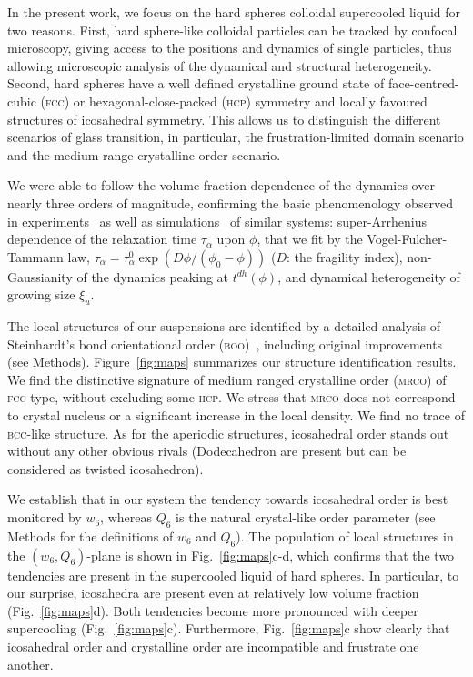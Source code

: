 In the present work, we focus on the hard spheres colloidal supercooled liquid for two reasons. First, hard sphere-like colloidal particles can be tracked by confocal microscopy, giving access to the positions and dynamics of single particles, thus allowing microscopic analysis of the dynamical and structural heterogeneity. Second, hard spheres have a well defined crystalline ground state of face-centred-cubic (\textsc{fcc}) or hexagonal-close-packed (\textsc{hcp}) symmetry and locally favoured structures of icosahedral symmetry. This allows us to distinguish the different scenarios of glass transition, in particular, the frustration-limited domain scenario and the medium range crystalline order scenario.



We were able to follow the volume fraction dependence of the dynamics over nearly three orders of magnitude, confirming the basic phenomenology observed in experiments~\citep{pusey1987ogt, kegel2000swe, weeks2000, Berthier2005} as well as simulations~\citep{Kawasaki2010} of similar systems: super-Arrhenius dependence of the relaxation time $\tau_\alpha$ upon $\phi$, that we fit by the Vogel-Fulcher-Tammann law, 
$\tau_\alpha=\tau_\alpha^0 \exp(D\phi/(\phi_0-\phi))$ ($D$: the fragility index), non-Gaussianity of the dynamics peaking at $t^{dh}(\phi)$, and dynamical heterogeneity of growing size $\xi_u$.



The local structures of our suspensions are identified by a detailed analysis of Steinhardt's bond orientational order (\textsc{boo})~\citep{steinhardt1983boo}, including original improvements (see Methods). Figure~\ref{fig:maps} summarizes our structure identification results. We find the distinctive signature of medium ranged crystalline order (\textsc{mrco}) of \textsc{fcc} type, without excluding some \textsc{hcp}. We stress that \textsc{mrco} does not correspond to crystal nucleus or a significant increase in the local density. We find no trace of \textsc{bcc}-like structure. As for the aperiodic structures, icosahedral order stands out without any other obvious rivals (Dodecahedron are present but can be considered as twisted icosahedron).



We establish that in our system the tendency towards icosahedral order is best monitored by $w_6$, whereas $Q_6$ is the natural crystal-like order parameter (see Methods for the definitions of $w_6$ and $Q_6$). The population of local structures in the $(w_6,Q_6)$-plane is shown in Fig.~\ref{fig:maps}c-d, which confirms that the two tendencies are present in the supercooled liquid of hard spheres. In particular, to our surprise, icosahedra are present even at relatively low volume fraction (Fig.~\ref{fig:maps}d). Both tendencies become more pronounced with deeper supercooling (Fig.~\ref{fig:maps}c). Furthermore, Fig.~\ref{fig:maps}c show clearly that icosahedral order and crystalline order are incompatible and frustrate one another.



